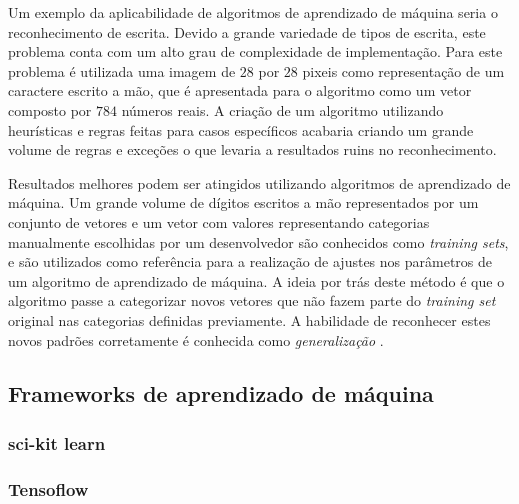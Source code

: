 Um exemplo da aplicabilidade de algoritmos de aprendizado de máquina seria o reconhecimento de escrita. Devido a grande variedade de tipos de escrita, este problema conta com um alto grau de complexidade de implementação. Para este problema é utilizada uma imagem de $28$ por $28$ pixeis como representação de um caractere escrito a mão, que é apresentada para o algoritmo como um vetor composto por $784$ números reais. A criação de um algoritmo utilizando heurísticas e regras feitas para casos específicos acabaria criando um grande volume de regras e exceções o que levaria a resultados ruins no reconhecimento. \cite{bishop:2006}

Resultados melhores podem ser atingidos utilizando algoritmos de aprendizado de máquina. Um grande volume de dígitos escritos a mão representados por um conjunto de vetores e um vetor com valores representando categorias manualmente escolhidas por um desenvolvedor são conhecidos como \textit{training sets}, e são utilizados como referência para a realização de ajustes nos parâmetros de um algoritmo de aprendizado de máquina. A ideia por trás deste método é que o algoritmo passe a categorizar novos vetores que não fazem parte do \textit{training set} original nas categorias definidas previamente. A habilidade de reconhecer estes novos padrões corretamente é conhecida como \textit{generalização} \cite{bishop:2006}.

\subsection{Frameworks de aprendizado de máquina}

\subsubsection{sci-kit learn}

\subsubsection{Tensoflow}

